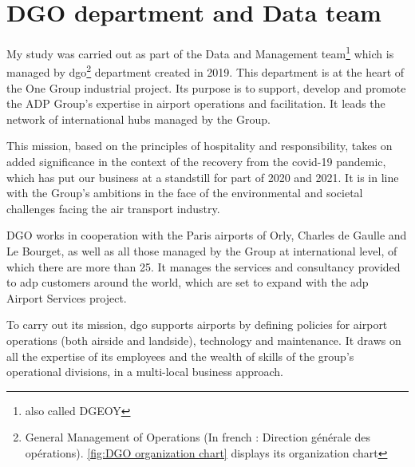 \documentclass[12pt]{article}
\begin{document}



\newpage
\section{DGO department and Data team}

My study was carried out as part of the Data and Management team\footnote{also called DGEOY} which is managed by \acrshort{dgo}\footnote{General Management of Operations (In french : Direction générale des opérations). \autoref{fig:DGO organization chart} displays its organization chart} department created in 2019. This department is at the heart of the One Group industrial project. Its purpose is to support, develop and promote the ADP Group's expertise in airport operations and facilitation. It leads the network of international hubs managed by the Group.

This mission, based on the principles of hospitality and responsibility, takes on added significance in the context of the recovery from the covid-19 pandemic, which has put our business at a standstill for part of 2020 and 2021. It is in line with the Group's ambitions in the face of the environmental and societal challenges facing the air transport industry.

DGO works in cooperation with the Paris airports of Orly, Charles de Gaulle and Le Bourget, as well as all those managed by the Group at international level, of which there are more than 25. It manages the services and consultancy provided to \acrshort{adp} customers around the world, which are set to expand with the \acrshort{adp} Airport Services project.

To carry out its mission, \acrshort{dgo} supports airports by defining policies for airport operations (both airside and landside), technology and maintenance. It draws on all the expertise of its employees and the wealth of skills of the group's operational divisions, in a multi-local business approach. \hfill \break
\end{document}
